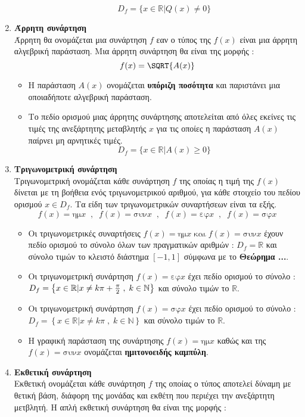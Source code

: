 \documentclass[twoside,10pt]{book}
\DeclareRobustCommand{\frac}[3][0pt]{%
{\begingroup\hspace{#1}#2\hspace{#1}\endgroup\over\hspace{#1}#3\hspace{#1}}}
\newcommand{\hm}[1]{\textrm{ημ}#1}
\newcommand{\syn}[1]{\textrm{συν}#1}
\newcommand{\ef}[1]{\textrm{εφ}#1}
\newcommand{\syf}[1]{\textrm{σφ}#1}
\begin{document}
\begin{enumerate}[itemsep=0mm,label=\bf\arabic*.]
\begin{itemize}[itemsep=0mm]
\[ D_f=\{x\in\mathbb{R}|Q(x)\neq0\} \]
\end{itemize}
\item \textbf{Άρρητη συνάρτηση}\\
Άρρητη θα ονομάζεται μια συνάρτηση $ f $ εαν ο τύπος της $ f(x) $ είναι μια άρρητη αλγεβρική παράσταση. Μια άρρητη συνάρτηση θα είναι της μορφής :
\[ f(x)=\SQRT{A(x)} \]
\begin{itemize}[itemsep=0mm]
\item Η παράσταση $ A(x) $ ονομάζεται \textbf{υπόριζη ποσότητα} και παριστάνει μια οποιαδήποτε αλγεβρική παράσταση.
\item Το πεδίο ορισμού μιας άρρητης συνάρτησης αποτελείται από όλες εκείνες τις τιμές της ανεξάρτητης μεταβλητής $ x $ για τις οποίες η παράσταση $ A(x) $ παίρνει μη αρνητικές τιμές.
\[ D_f=\{x\in\mathbb{R}|A(x)\geq0\} \]
\end{itemize}
\item \textbf{Τριγωνομετρική συνάρτηση}\\
Τριγωνομετρική ονομάζεται κάθε συνάρτηση $ f $ της οποίας η τιμή της $ f(x) $ δίνεται με τη βοήθεια ενός τριγωνομετρικού αριθμού, για κάθε στοιχείο του πεδίου ορισμού $ x\in D_f $. Τα είδη των τριγωνομετρικών συναρτήσεων είναι τα εξής.
\[ f(x)=\hm{x}\;\;,\;\;f(x)=\syn{x}\;\;,\;\;f(x)=\ef{x}\;\;,\;\;f(x)=\syf{x} \]
\begin{itemize}
\item Οι τριγωνομετρικές συναρτήσεις $ f(x)=\hm{x}\;\textrm{και}\;f(x)=\syn{x} $ έχουν πεδίο ορισμού το σύνολο όλων των πραγματικών αριθμών : $ D_f=\mathbb{R} $ και σύνολο τιμών το κλειστό διάστημα $ [-1,1] $ σύμφωνα με το \textbf{Θεώρημα ...}.
\item Οι τριγωνομετρική συνάρτηση $ f(x)=\ef{x} $ έχει πεδίο ορισμού το σύνολο : $ D_f=\left\lbrace x\in\mathbb{R}|x\neq k\pi+\frac{\pi}{2}\;,\;k\in\mathbb{N}\right\rbrace  $ και σύνολο τιμών το $ \mathbb{R} $.
\item Οι τριγωνομετρική συνάρτηση $ f(x)=\syf{x} $ έχει πεδίο ορισμού το σύνολο : $ D_f=\left\lbrace x\in\mathbb{R}|x\neq k\pi\;,\;k\in\mathbb{N}\right\rbrace  $ και σύνολο τιμών το $ \mathbb{R} $.
\item Η γραφική παράσταση της συνάρτησης $ f(x)=\hm{x} $ καθώς και της $ f(x)=\syn{x} $ ονομάζεται \textbf{ημιτονοειδής καμπύλη}.
\end{itemize}
\item \textbf{Εκθετική συνάρτηση}\\
Εκθετική ονομάζεται κάθε συνάρτηση $ f $ της οποίας ο τύπος αποτελεί δύναμη με θετική βάση, διάφορη της μονάδας και εκθέτη που περιέχει την ανεξάρτητη μετβλητή. Η απλή εκθετική συνάρτηση θα είναι της μορφής :

\end{enumerate}
\end{document}
